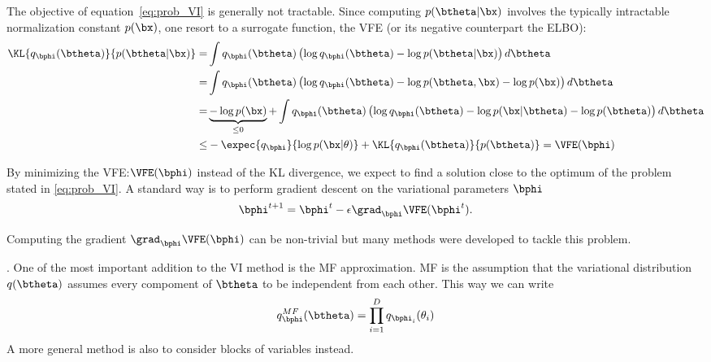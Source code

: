 The objective of equation~\eqref{eq:prob_VI} is generally not tractable.
Since computing $p(\btheta|\bx)$ involves the typically intractable normalization constant $p(\bx)$, one resort to a surrogate function, the \ac{VFE} (or its negative counterpart the \ac{ELBO}):
\begin{align}
\KL{q_{\bphi}(\btheta)}{p(\btheta|\bx)} =& \int q_{\bphi}(\btheta) \left(\log q_{\bphi}(\btheta) - \log p(\btheta|\bx)\right)d\btheta\\
=&\int q_{\bphi}(\btheta) \left(\log q_{\bphi}(\btheta) - \log p(\btheta, \bx) - \log p(\bx)\right)d\btheta\\
=&\underbrace{- \log p(\bx)}_{\leq 0} + \int q_{\bphi}(\btheta) \left(\log q_{\bphi}(\btheta) - \log p(\bx|\btheta)- \log p(\btheta) \right)d\btheta\\
\leq& -\expec{q_{\bphi}}{\log p(\bx|\theta)} + \KL{q_{\bphi}(\btheta)}{p(\btheta)} = \VFE(\bphi)
\end{align}


By minimizing the \ac{VFE}:$\VFE(\bphi)$ instead of the \ac{KL} divergence, we expect to find a solution close to the optimum of the problem stated in \eqref{eq:prob_VI}.
A standard way is to perform gradient descent on the variational parameters $\bphi$
\begin{align}
\bphi^{t+1} = \bphi^{t} - \epsilon \grad_{\bphi}\VFE(\bphi^{t}).
\end{align}

Computing the gradient $\grad_{\bphi}\VFE(\bphi)$ can be non-trivial but many methods were developed to tackle this problem.

.
One of the most important addition to the \ac{VI} method is the \ac{MF} approximation.
\ac{MF} is the assumption that the variational distribution $q(\btheta)$ assumes every compoment of $\btheta$ to be independent from each other.
This way we can write
\begin{align}
q^{MF}_{\bphi}(\btheta) = \prod_{i=1}^D q_{\bphi_i}(\theta_i)
\end{align}
A more general method is also to consider blocks of variables instead.

